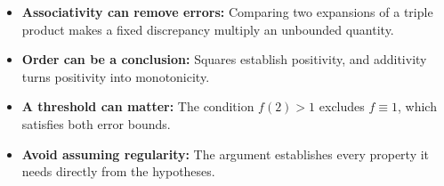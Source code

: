 \begin{takeaways}
\begin{itemize}
\item \textbf{Associativity can remove errors:} Comparing two expansions of a triple product makes a fixed discrepancy multiply an unbounded quantity.
\item \textbf{Order can be a conclusion:} Squares establish positivity, and additivity turns positivity into monotonicity.
\item \textbf{A threshold can matter:} The condition \(f(2)>1\) excludes \(f\equiv1\), which satisfies both error bounds.
\item \textbf{Avoid assuming regularity:} The argument establishes every property it needs directly from the hypotheses.
\end{itemize}
\end{takeaways}
